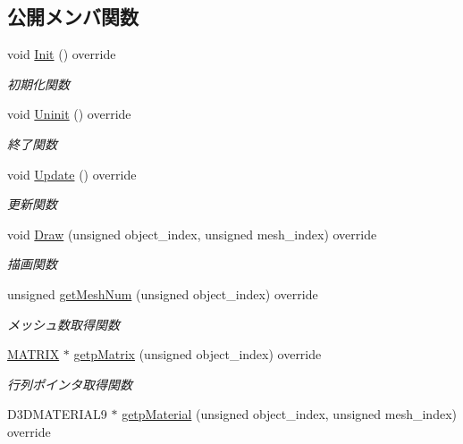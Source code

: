 \subsection*{公開メンバ関数}
\begin{DoxyCompactItemize}
\item 
void \mbox{\hyperlink{class_tutorial_logo_draw_a53fc4b1b23c7f9e249600be67510f944}{Init}} () override
\begin{DoxyCompactList}\small\item\em 初期化関数 \end{DoxyCompactList}\item 
void \mbox{\hyperlink{class_tutorial_logo_draw_a949fb70954e3df28f87b8ed5c61bf8f1}{Uninit}} () override
\begin{DoxyCompactList}\small\item\em 終了関数 \end{DoxyCompactList}\item 
void \mbox{\hyperlink{class_tutorial_logo_draw_af69405fcc8b20684a19e982726d93ffa}{Update}} () override
\begin{DoxyCompactList}\small\item\em 更新関数 \end{DoxyCompactList}\item 
void \mbox{\hyperlink{class_tutorial_logo_draw_aa808cfb8bc59d58bbd698a195603429f}{Draw}} (unsigned object\+\_\+index, unsigned mesh\+\_\+index) override
\begin{DoxyCompactList}\small\item\em 描画関数 \end{DoxyCompactList}\item 
unsigned \mbox{\hyperlink{class_tutorial_logo_draw_a0e56784e25f1f83e6ff167280b801aad}{get\+Mesh\+Num}} (unsigned object\+\_\+index) override
\begin{DoxyCompactList}\small\item\em メッシュ数取得関数 \end{DoxyCompactList}\item 
\mbox{\hyperlink{_vector3_d_8h_a032295cd9fb1b711757c90667278e744}{M\+A\+T\+R\+IX}} $\ast$ \mbox{\hyperlink{class_tutorial_logo_draw_aade531190180c385c266f5698f99735d}{getp\+Matrix}} (unsigned object\+\_\+index) override
\begin{DoxyCompactList}\small\item\em 行列ポインタ取得関数 \end{DoxyCompactList}\item 
D3\+D\+M\+A\+T\+E\+R\+I\+A\+L9 $\ast$ \mbox{\hyperlink{class_tutorial_logo_draw_acbd9aefdbd4450188e561fb5e5dcd64f}{getp\+Material}} (unsigned object\+\_\+index, unsigned mesh\+\_\+index) override

\end{DoxyCompactItemize}
